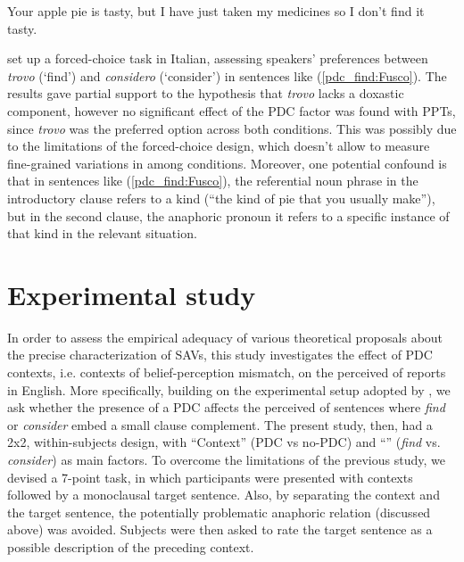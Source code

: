 \documentclass[output=paper,colorlinks,citecolor=brown]{langscibook}
\begin{document}
\ea Your apple pie is tasty, but I have just taken my medicines so I don’t find it tasty. \label{pdc_find:Fusco}
\z

\citet{fusco2022sav} set up a forced-choice task in Italian, assessing speakers’ preferences between \textit{trovo} (‘find’) and \textit{considero} (‘consider’) in sentences like (\ref{pdc_find:Fusco}). The results gave partial support to the hypothesis that \textit{trovo} lacks a doxastic component, however no significant effect of the PDC factor was found with PPTs, since \textit{trovo} was the preferred option across both conditions. This was possibly due to the limitations of the forced-choice design, which doesn’t allow to measure fine-grained variations in  among conditions. Moreover, one potential confound is that in sentences like (\ref{pdc_find:Fusco}), the referential noun phrase in the introductory clause refers to a kind (“the kind of pie that you usually make”), but in the second clause, the anaphoric pronoun it refers to a specific instance of that kind in the relevant situation.

\section{Experimental study}
\label{sec:present_study:Fusco}

In order to assess the empirical adequacy of various theoretical proposals about the precise characterization of SAVs, this study investigates the effect of PDC contexts, i.e. contexts of belief-perception mismatch, on the perceived  of  reports in English. 
More specifically, building on the experimental setup adopted by \citet{fusco2022sav}, we ask whether the presence of a PDC affects the perceived  of sentences where \textit{find} or \textit{consider} embed a small clause complement. The present study, then, had a 2x2, within-subjects design, with “Context” (PDC vs no-PDC) and “” (\textit{find} vs. \textit{consider}) as main factors. To overcome the limitations of the previous study, we devised a 7-point  task, in which participants were presented with contexts followed by a monoclausal target sentence. Also, by separating the context and the target sentence, the potentially problematic anaphoric relation (discussed above) was avoided. Subjects were then asked to rate the target sentence as a possible description of the preceding context. 
\end{document}
